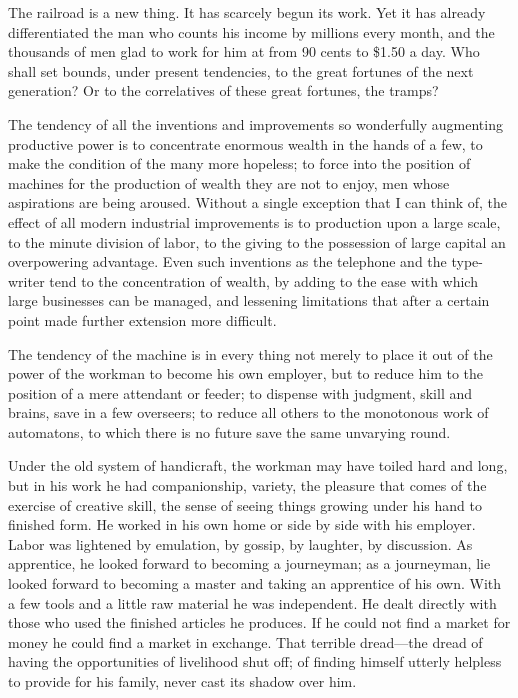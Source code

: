 \documentclass{book}
\begin{document}
The railroad is a new thing. It has scarcely begun its work. Yet it has already differentiated the man who counts his income by millions every month, and the thousands of men glad to work for him at from 90 cents to \$1.50 a day. Who shall set bounds, under present tendencies, to the great fortunes of the next generation? Or to the correlatives of these great fortunes, the tramps?

The tendency of all the inventions and improvements so wonderfully augmenting productive power is to concentrate enormous wealth in the hands of a few, to make the condition of the many more hopeless; to force into the position of machines for the production of wealth they are not to enjoy, men whose aspirations are being aroused. Without a single exception that I can think of, the effect of all modern industrial improvements is to production upon a large scale, to the minute division of labor, to the giving to the possession of large capital an overpowering advantage. Even such inventions as the telephone and the type-writer tend to the concentration of wealth, by adding to the ease with which large businesses can be managed, and lessening limitations that after a certain point made further extension more difficult.

The tendency of the machine is in every thing not merely to place it out of the power of the workman to become his own employer, but to reduce him to the position of a mere attendant or feeder; to dispense with judgment, skill and brains, save in a few overseers; to reduce all others to the monotonous work of automatons, to which there is no future save the same unvarying round.

Under the old system of handicraft, the workman may have toiled hard and long, but in his work he had companionship, variety, the pleasure that comes of the exercise of creative skill, the sense of seeing things growing under his hand to finished form. He worked in his own home or side by side with his employer. Labor was lightened by emulation, by gossip, by laughter, by discussion. As apprentice, he looked forward to becoming a journeyman; as a journeyman, lie looked forward to becoming a master and taking an apprentice of his own. With a few tools and a little raw material he was independent. He dealt directly with those who used the finished articles he produces. If he could not find a market for money he could find a market in exchange. That terrible dread—the dread of having the opportunities of livelihood shut off; of finding himself utterly helpless to provide for his family, never cast its shadow over him.
\end{document}
